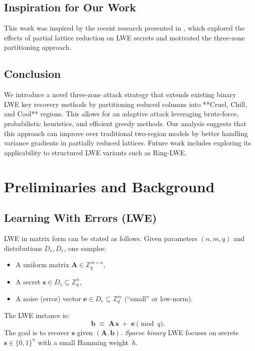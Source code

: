 \documentclass[conference]{IEEEtran}
\begin{document}
  \subsection{Inspiration for Our Work}
  This work was inspired by the recent research presented in \cite{cool-and-cruel}, which explored the effects of partial lattice reduction on LWE secrets and motivated the three-zone partitioning approach.
  
  \subsection{Conclusion}
  
  We introduce a novel three-zone attack strategy that extends existing binary LWE key recovery methods by partitioning reduced columns into **Cruel, Chill, and Cool** regions. This allows for an adaptive attack leveraging brute-force, probabilistic heuristics, and efficient greedy methods. Our analysis suggests that this approach can improve over traditional two-region models by better handling variance gradients in partially reduced lattices. Future work includes exploring its applicability to structured LWE variants such as Ring-LWE.
  
\section{Preliminaries and Background}
\label{sec:preliminaries}

\subsection{Learning With Errors (LWE)}
\label{subsec:lwe-def}

LWE in matrix form can be stated as follows. 
Given parameters $(n,m,q)$ and distributions $D_s,D_e$, one samples:
\begin{itemize}
    \item A uniform matrix $\mathbf{A} \in \mathbb{Z}_q^{m \times n}$,
    \item A secret $\mathbf{s} \in D_s \subseteq \mathbb{Z}_q^n$,
    \item A noise (error) vector $\mathbf{e} \in D_e \subseteq \mathbb{Z}_q^m$ (``small'' or low-norm).
\end{itemize}
The LWE instance is:
\[
    \mathbf{b} \;\equiv\; \mathbf{A}\,\mathbf{s} \;+\; \mathbf{e} 
    \pmod{q}.
\]
The goal is to recover $\mathbf{s}$ given $(\mathbf{A},\mathbf{b})$. 
\emph{Sparse binary} LWE focuses on secrets $\mathbf{s}\in\{0,1\}^n$ with a small Hamming weight~$h$.
\end{document}
